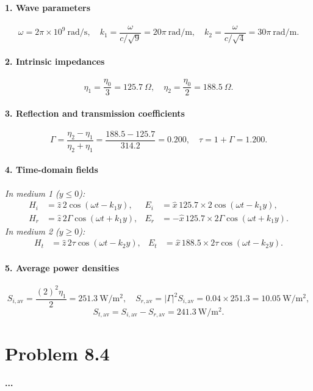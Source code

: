 \paragraph{1. Wave parameters}
\[
\omega = 2\pi \times 10^9\ \mathrm{rad/s},\quad
k_1 = \frac{\omega}{c/\sqrt{9}} = 20\pi\ \mathrm{rad/m},\quad
k_2 = \frac{\omega}{c/\sqrt{4}} = 30\pi\ \mathrm{rad/m}.
\]

\paragraph{2. Intrinsic impedances}
\[
\eta_1 = \frac{\eta_0}{3} = 125.7\ \Omega,
\quad
\eta_2 = \frac{\eta_0}{2} = 188.5\ \Omega.
\]

\paragraph{3. Reflection and transmission coefficients}
\[
\Gamma = \frac{\eta_2 - \eta_1}{\eta_2 + \eta_1}
       = \frac{188.5 - 125.7}{314.2}
       = 0.200,
\quad
\tau = 1 + \Gamma = 1.200.
\]

\paragraph{4. Time-domain fields}
\textit{In medium 1 ($y\le0$):}
\[
\begin{aligned}
H_i &= \hat z\,2\cos(\omega t - k_1 y), &
E_i &= \hat x\,125.7 \times 2\cos(\omega t - k_1 y),\\
H_r &= \hat z\,2\Gamma\cos(\omega t + k_1 y), &
E_r &= -\hat x\,125.7 \times 2\Gamma\cos(\omega t + k_1 y).
\end{aligned}
\]
\textit{In medium 2 ($y\ge0$):}
\[
\begin{aligned}
H_t &= \hat z\,2\tau\cos(\omega t - k_2 y), &
E_t &= \hat x\,188.5 \times 2\tau\cos(\omega t - k_2 y).
\end{aligned}
\]

\paragraph{5. Average power densities}
\[
S_{i,\mathrm{av}}
= \frac{(2)^2 \eta_1}{2}
= 251.3\ \mathrm{W/m^2},\quad
S_{r,\mathrm{av}}
= |\Gamma|^2 S_{i,\mathrm{av}}
= 0.04 \times 251.3
= 10.05\ \mathrm{W/m^2},
\]
\[
S_{t,\mathrm{av}}
= S_{i,\mathrm{av}} - S_{r,\mathrm{av}}
= 241.3\ \mathrm{W/m^2}.
\]

\section*{Problem 8.4}
\textbf{...}

